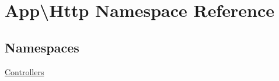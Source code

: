 \hypertarget{namespace_app_1_1_http}{}\section{App\textbackslash{}Http Namespace Reference}
\label{namespace_app_1_1_http}
\subsection*{Namespaces}
\begin{DoxyCompactItemize}
\item 
 \mbox{\hyperlink{namespace_app_1_1_http_1_1_controllers}{Controllers}}
\end{DoxyCompactItemize}
